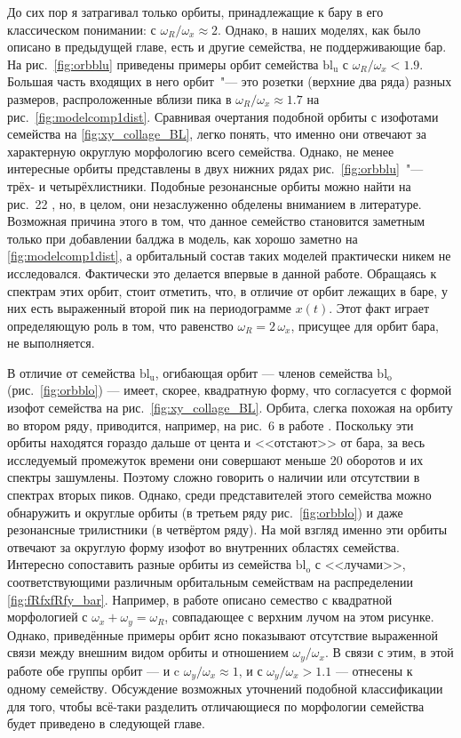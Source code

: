 \documentclass[tikz]{trlnotes}
\begin{document}
До сих пор я затрагивал только орбиты, принадлежащие к бару в его классическом понимании: с $ω_R/ω_x \approx 2$.
Однако, в наших моделях, как было описано в предыдущей главе, есть и другие семейства, не поддерживающие бар.
На рис.~\ref{fig:orbblu} приведены примеры орбит семейства $\text{bl}_{\text{u}}$ с $ω_R/ω_x < 1.9$. Большая часть 
входящих в него орбит~"--- это розетки (верхние два ряда) разных размеров, распроложенные вблизи пика в $ω_R/ω_x \approx 1.7$ на рис.~\ref{fig:modelcomp1dist}.
Сравнивая очертания подобной орбиты с изофотами семейства на \ref{fig:xy_collage_BL}, легко понять, что именно они отвечают
за характерную округлую морфологию всего семейства. Однако, не менее интересные орбиты представлены в двух нижних рядах рис.~\ref{fig:orbblu}~"--- трёх- и четырёхлистники. Подобные резонансные орбиты можно найти на рис.~22 \citet{voglis2007}, но, в целом, они незаслуженно обделены вниманием в литературе.
Возможная причина этого в том, что данное семейство становится заметным только при добавлении балджа в модель, как хорошо
заметно на \ref{fig:modelcomp1dist}, а орбитальный состав таких моделей практически никем не исследовался. Фактически это делается впервые в данной работе. 
Обращаясь к спектрам этих орбит, стоит отметить, что, в отличие от орбит лежащих в баре, у них есть выраженный второй пик на периодограмме $x(t)$. Этот факт играет определяющую роль в том, что  равенство $ω_R = 2\,ω_x$, присущее для орбит бара, не выполняется.

В отличие от семейства $\text{bl}_{\text{u}}$, огибающая орбит --- членов семейства $\text{bl}_{\text{o}}$ (рис.~\ref{fig:orbblo}) --- 
имеет, скорее, квадратную форму, что согласуется с формой изофот семейства на рис.~\ref{fig:xy_collage_BL}. Орбита, слегка похожая на орбиту во втором ряду, приводится, например, на рис.~6 в работе \cite{gajda2016}. Поскольку эти орбиты находятся
гораздо дальше от цента и <<отстают>> от бара, за весь исследуемый промежуток времени они совершают меньше 20 оборотов и их спектры зашумлены. Поэтому сложно говорить о наличии или отсутствии в спектрах вторых пиков. Однако, среди представителей этого семейства можно обнаружить и округлые орбиты (в третьем ряду рис.~\ref{fig:orbblo}) и даже резонансные трилистники (в четвёртом ряду). 
На мой взгляд именно эти орбиты отвечают за округлую форму изофот во внутренних областях семейства. 
Интересно сопоставить разные орбиты из семейства $\text{bl}_\text{o}$ с <<лучами>>, соответствующими различным орбитальным семействам на распределении \ref{fig:fRfxfRfy_bar}. 
Например, в работе \cite{gajda2016} описано семество с квадратной морфологией с $ω_x + ω_y = ω_R$, совпадающее с верхним 
лучом на этом рисунке. Однако, приведённые примеры орбит ясно показывают отсутствие выраженной связи между внешним видом орбиты и отношением $ω_y/ω_x$.
В связи с этим, в этой работе обе группы орбит --- и c $ω_y/ω_x \approx 1$, и с $ω_y/ω_x > 1.1$ --- отнесены к одному семейству. 
Обсуждение возможных уточнений подобной классификации для того, 
чтобы всё-таки разделить отличающиеся по морфологии семейства будет приведено в следующей главе.
\end{document}
